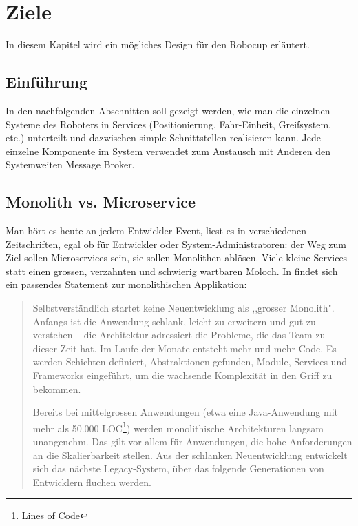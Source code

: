 \chapter{Ziele}
\label{chap:software-design}
In diesem Kapitel wird ein mögliches Design für den Robocup erläutert.
\section{Einführung}
In den nachfolgenden Abschnitten soll gezeigt werden, wie man die einzelnen Systeme des Roboters in Services (Positionierung, Fahr-Einheit, Greifsystem, etc.) unterteilt und dazwischen simple Schnittstellen realisieren kann.
Jede einzelne Komponente im System verwendet zum Austausch mit Anderen den Systemweiten Message Broker.

\section{Monolith vs. Microservice}
Man hört es heute an jedem Entwickler-Event, liest es in verschiedenen Zeitschriften, egal ob für Entwickler oder System-Administratoren: der Weg zum Ziel sollen Microservices sein, sie sollen Monolithen ablösen. Viele kleine Services statt einen grossen, verzahnten und schwierig wartbaren Moloch.
In \cite{informatik-aktuell-microservices} findet sich ein passendes Statement zur monolithischen Applikation:
\begin{quote}
	Selbstverständlich startet keine Neuentwicklung als ,,grosser Monolith". Anfangs ist die Anwendung schlank, leicht zu erweitern und gut zu verstehen – die Architektur adressiert die Probleme, die das Team zu dieser Zeit hat. Im Laufe der Monate entsteht mehr und mehr Code. Es werden Schichten definiert, Abstraktionen gefunden, Module, Services und Frameworks eingeführt, um die wachsende Komplexität in den Griff zu bekommen.
	
	Bereits bei mittelgrossen Anwendungen (etwa eine Java-Anwendung mit mehr als 50.000 LOC\footnote{Lines of Code}) werden monolithische Architekturen langsam unangenehm. Das gilt vor allem für Anwendungen, die hohe Anforderungen an die Skalierbarkeit stellen. Aus der schlanken Neuentwicklung entwickelt sich das nächste Legacy-System, über das folgende Generationen von Entwicklern fluchen werden.
\end{quote}
